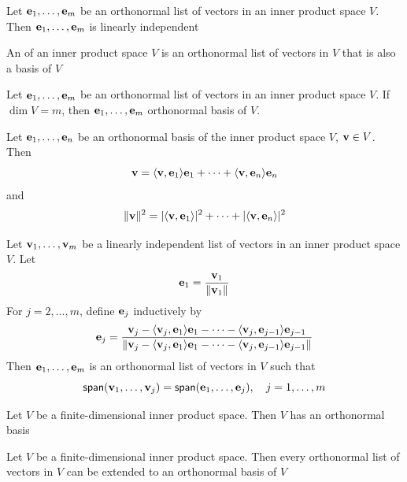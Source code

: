 \documentclass[aspectratio=169]{beamer}
\begin{document}
\begin{frame}
\begin{importanttheorem}
Let $\mathbf{e}_1,\ldots,\mathbf{e}_m$ be an orthonormal list of vectors in an inner product space $V$. Then $\mathbf{e}_1,\ldots,\mathbf{e}_m$ is linearly independent
\end{importanttheorem}
\vfill
\begin{definition}
An  of an inner product space $V$ is an orthonormal list of vectors in $V$ that is also a basis of $V$
\end{definition}
\vfill
\begin{theorem}
Let $\mathbf{e}_1,\ldots,\mathbf{e}_m$ be an orthonormal list of vectors in an inner product space $V$.
If $\dim V=m$, then $\mathbf{e}_1,\ldots,\mathbf{e}_m$ orthonormal basis of $V$.
\end{theorem}
\end{frame}

\begin{frame}
\begin{importanttheorem}
Let $\mathbf{e}_1,\ldots,\mathbf{e}_n$ be an orthonormal basis of the inner product space $V$, $\mathbf{v}\in V$. Then
\[
\mathbf{v}=\langle \mathbf{v},\mathbf{e}_1\rangle \mathbf{e}_1
+\cdots+
\langle \mathbf{v},\mathbf{e}_n\rangle \mathbf{e}_n
\]
and
\[
\|\mathbf{v}\|^2=|\langle \mathbf{v},\mathbf{e}_1\rangle|^2
+\cdots
+|\langle \mathbf{v},\mathbf{e}_n\rangle|^2
\]
\end{importanttheorem}
\end{frame}


\begin{frame}
\begin{importanttheorem}
Let $\mathbf{v}_1,\ldots,\mathbf{v}_m$ be a linearly independent list of vectors in an inner product space $V$. Let
\[
\mathbf{e}_1=\dfrac{\mathbf{v}_1}{\|\mathbf{v}_1\|}
\]
For $j=2,\ldots,m$, define $\mathbf{e}_j$ inductively by
\[
\mathbf{e}_j = \dfrac
{\mathbf{v}_j-\langle \mathbf{v}_j,\mathbf{e}_1\rangle \mathbf{e}_1-\cdots-\langle \mathbf{v}_j,\mathbf{e}_{j-1}\rangle \mathbf{e}_{j-1}}
{\|\mathbf{v}_j-\langle \mathbf{v}_j,\mathbf{e}_1\rangle \mathbf{e}_1-\cdots-\langle \mathbf{v}_j,\mathbf{e}_{j-1}\rangle \mathbf{e}_{j-1}\|}
\]
Then $\mathbf{e}_1,\ldots,\mathbf{e}_m$ is an orthonormal list of vectors in $V$ such that
\[
\mathsf{span}(\mathbf{v}_1,\ldots,\mathbf{v}_j)=\mathsf{span}(\mathbf{e}_1,\ldots,\mathbf{e}_j),\quad j=1,\ldots,m
\]
\end{importanttheorem}
\end{frame}


\begin{frame}
\begin{importanttheorem}
Let $V$ be a finite-dimensional inner product space. Then $V$ has an orthonormal basis
\end{importanttheorem}
\vfill
\begin{theorem}
Let $V$ be a finite-dimensional inner product space.
Then every orthonormal list of vectors in $V$ can be extended to an orthonormal basis of $V$ 
\end{theorem}
\end{frame}
\end{document}
